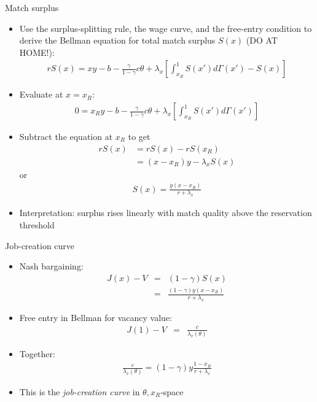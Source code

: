 \documentclass[9pt]{beamer}
\newcommand{\bit}{\begin{itemize}}
\newcommand{\eit}{\end{itemize}}
\newcommand{\lb}{\label}
\newcommand{\rc}{\color{red}}
\begin{document}
\begin{frame}{Match surplus}

\bit
\setlength\itemsep{1em}

\item Use the surplus-splitting rule, the wage curve, and the free-entry condition to derive the Bellman equation for total match surplus $S(x)$ ({\rc DO AT HOME!}):
\begin{align}
rS(x) =  xy-b-\frac{\gamma}{1-\gamma}c\theta + \lambda_x \left[\int_{x_R}^{1}S(x')d\Gamma(x') - S(x)\right] \nonumber
\end{align}

\item Evaluate at $x=x_R$:
\begin{align}
0 =  x_R y-b-\frac{\gamma}{1-\gamma}c\theta + \lambda_x \left[\int_{x_R}^{1}S(x')d\Gamma(x') \right] \nonumber
\end{align}

\item Subtract the equation at $x_R$ to get
\begin{align}
rS(x) &=  rS(x)-rS(x_R) \nonumber \\
&= (x-x_R)y -  \lambda_x S(x) \nonumber
\end{align}
or
\begin{eqnarray}
	\lb{s_solution}
	S(x) = \frac{y(x-x_R)}{r+\lambda_x} \nonumber
\end{eqnarray}

\item Interpretation: surplus rises linearly with match quality above the reservation threshold

\eit
\end{frame}


\begin{frame}{Job-creation curve}

\bit
\setlength\itemsep{1em}

\item Nash bargaining:
\begin{eqnarray}
	J(x)-V &=& (1-\gamma) S(x) \nonumber \\
	&=& \frac{(1-\gamma) y(x-x_R)}{r+\lambda_x}  \nonumber
\end{eqnarray}

\item Free entry in Bellman for vacancy value:
\begin{eqnarray}
J(1)-V &=& \frac{c}{\lambda_v(\theta)} \nonumber
\end{eqnarray}

\item Together: 
\begin{eqnarray}
	\frac{c}{\lambda_v(\theta)} = (1-\gamma) y \frac{1-x_R}{r+\lambda_x} \nonumber
\end{eqnarray}

\item This is the \emph{job-creation curve} in $\theta,x_R$-space


\eit
\end{frame}
\end{document}
